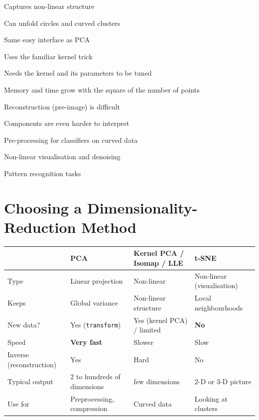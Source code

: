 {\item Captures non-linear structure
 \item Can unfold circles and curved clusters
 \item Same easy interface as PCA
 \item Uses the familiar kernel trick}
{\item Needs the kernel and its parameters to be tuned
 \item Memory and time grow with the square of the number of points
 \item Reconstruction (pre-image) is difficult
 \item Components are even harder to interpret}
{\item Pre-processing for classifiers on curved data
 \item Non-linear visualisation and denoising
 \item Pattern recognition tasks}

\section{Choosing a Dimensionality-Reduction Method}

\begin{center}
\small
\begin{tabular}{@{}p{3cm}p{3.7cm}p{3.7cm}p{3.5cm}@{}}
\toprule
 & \textbf{PCA} & \textbf{Kernel PCA / Isomap / LLE} & \textbf{t-SNE}\\
\midrule
Type & Linear projection & Non-linear & Non-linear (visualisation)\\
Keeps & Global variance & Non-linear structure & Local neighbourhoods\\
New data? & Yes (\texttt{transform}) & Yes (kernel PCA) / limited & \textbf{No}\\
Speed & \textbf{Very fast} & Slower & Slow\\
Inverse (reconstruction) & Yes & Hard & No\\
Typical output & 2 to hundreds of dimensions & few dimensions & 2-D or 3-D picture\\
Use for & Preprocessing, compression & Curved data & Looking at clusters\\
\bottomrule
\end{tabular}
\end{center}

